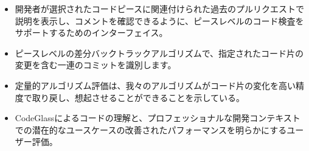\begin{itemize}
\setlength{\parskip}{1mm}
\setlength{\itemsep}{0mm}
	\item 開発者が選択されたコードピースに関連付けられた過去のプルリクエストで説明を表示し、コメントを確認できるように、ピースレベルのコード検査をサポートするためのインターフェイス。
	\item ピースレベルの差分バックトラックアルゴリズムで、指定されたコード片の変更を含む一連のコミットを識別します。
	\item 定量的アルゴリズム評価は、我々のアルゴリズムがコード片の変化を高い精度で取り戻し、想起させることができることを示している。
    \item CodeGlassによるコードの理解と、プロフェッショナルな開発コンテキストでの潜在的なユースケースの改善されたパフォーマンスを明らかにするユーザー評価。
\end{itemize}
